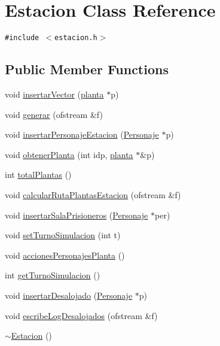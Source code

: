 \hypertarget{classEstacion}{
\section{Estacion Class Reference}
\label{classEstacion}
}
{\tt \#include $<$estacion.h$>$}

\subsection*{Public Member Functions}
\begin{CompactItemize}
\item 
void \hyperlink{classEstacion_7ccecfbe6a3cea5fd897cfce7851a005}{insertarVector} (\hyperlink{classplanta}{planta} $\ast$p)
\item 
void \hyperlink{classEstacion_30787e042212e82f38bd54868a673744}{generar} (ofstream \&f)
\item 
void \hyperlink{classEstacion_9cd8459a6f9c14168bd92edb88c68757}{insertarPersonajeEstacion} (\hyperlink{classPersonaje}{Personaje} $\ast$p)
\item 
void \hyperlink{classEstacion_846fcf5591b3a021072365cfd7902b4c}{obtenerPlanta} (int idp, \hyperlink{classplanta}{planta} $\ast$\&p)
\item 
int \hyperlink{classEstacion_5ab63daf24099fe7f461049191c5f45a}{totalPlantas} ()
\item 
void \hyperlink{classEstacion_b823f96e5395cf3b55ddfe2a380066a7}{calcularRutaPlantasEstacion} (ofstream \&f)
\item 
void \hyperlink{classEstacion_5e2d125234916b8011eabaf9735fd859}{insertarSalaPrisioneros} (\hyperlink{classPersonaje}{Personaje} $\ast$per)
\item 
void \hyperlink{classEstacion_61418af028ef6a48d6ccdd125cd739d6}{setTurnoSimulacion} (int t)
\item 
void \hyperlink{classEstacion_d0ea7dfe20aa29bf0dfc984849fbab1f}{accionesPersonajesPlanta} ()
\item 
int \hyperlink{classEstacion_e33e40e284a7e35858fef85ab1c13b19}{getTurnoSimulacion} ()
\item 
void \hyperlink{classEstacion_b130dedc0129c5a913415d3bacebd529}{insertarDesalojado} (\hyperlink{classPersonaje}{Personaje} $\ast$p)
\item 
void \hyperlink{classEstacion_fd81b9f346dce9a850fc2c612949d211}{escribeLogDesalojados} (ofstream \&f)
\item 
\hyperlink{classEstacion_c774576e546f622b60b08b0a952e6a55}{$\sim$Estacion} ()
\end{CompactItemize}
